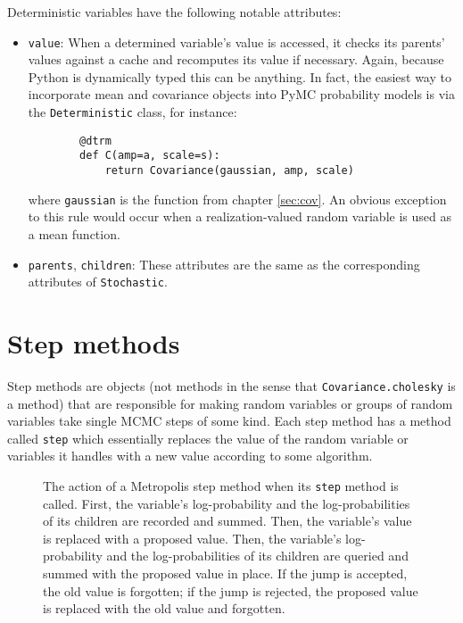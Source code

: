 \documentclass{report}
\begin{document}
Deterministic variables have the following notable attributes:
\begin{itemize}
    \item \texttt{value}: When a determined variable's value is accessed, it checks its parents' values against a cache and recomputes its value if necessary. Again, because Python is dynamically typed this can be anything. In fact, the easiest way to incorporate mean and covariance objects into PyMC probability models is via the \texttt{Deterministic} class, for instance:
    \begin{verbatim}
        @dtrm
        def C(amp=a, scale=s):
            return Covariance(gaussian, amp, scale)
    \end{verbatim}
    where \texttt{gaussian} is the function from chapter \ref{sec:cov}. An obvious exception to this rule would occur when a realization-valued random variable is used as a mean function.
    
    \item \texttt{parents}, \texttt{children}: These attributes are the same as the corresponding attributes of \texttt{Stochastic}. 
\end{itemize}

\section{Step methods}
Step methods are objects (not methods in the sense that \texttt{Covariance.cholesky} is a method) that are responsible for making random variables or groups of random variables take single MCMC steps of some kind. Each step method has a method called \texttt{step} which essentially replaces the value of the random variable or variables it handles with a new value according to some algorithm.

\begin{figure}
    \centering
    \caption{The action of a Metropolis step method when its \texttt{step} method is called. First, the variable's log-probability and the log-probabilities of its children are recorded and summed. Then, the variable's value is replaced with a proposed value. Then, the variable's log-probability and the log-probabilities of its children are queried and summed with the proposed value in place. If the jump is accepted, the old value is forgotten; if the jump is rejected, the proposed value is replaced with the old value and forgotten.}
    \label{metropoliscartoon}
\end{figure}
\end{document}
